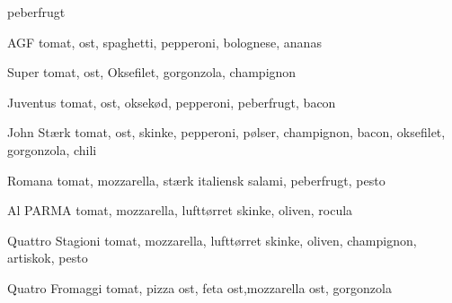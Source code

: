 \begin{multicols}{2}
\begin{enumdescription}
    peberfrugt
  \item[AGF] tomat, ost, spaghetti, pepperoni, bolognese, ananas
  \item[Super] tomat, ost, Oksefilet, gorgonzola, champignon
  \item[Juventus] tomat, ost, oksekød, pepperoni, peberfrugt, bacon
  \item[John Stærk] tomat, ost, skinke, pepperoni, pølser, champignon,
    bacon, oksefilet, gorgonzola, chili
  \item[Romana] tomat, mozzarella, stærk italiensk salami, peberfrugt,
    pesto
  \item[Al PARMA] tomat, mozzarella, lufttørret skinke, oliven, rocula
  \item[Quattro Stagioni] tomat, mozzarella, lufttørret skinke,
    oliven, champignon, artiskok, pesto
  \item[Quatro Fromaggi] tomat, pizza ost, feta ost,mozzarella ost,
    gorgonzola
  \end{enumdescription}
\end{multicols}



